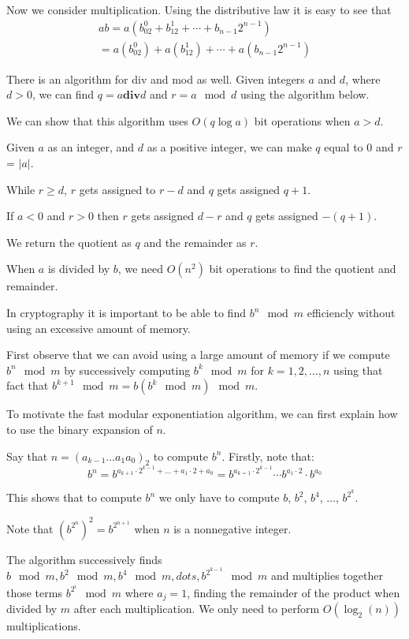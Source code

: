 \documentclass[../discrete.tex]{subfiles}
\begin{document}
Now we consider multiplication.
Using the distributive law it is easy to see that 
\begin{align*}
    ab = a(b_02^0+b_12^1+\cdots + b_{n-1}2^{n-1})\\
    = a(b_02^0)+a(b_12^1)+\cdots + a(b_{n-1}2^{n-1})
\end{align*}

There is an algorithm for div and mod as well.
Given integers $a$ and $d$, where $d>0$, we can find $q=a\textbf{div} d$ and $r=a\mod d$ using the algorithm below.

We can show that this algorithm uses $O(q\log a)$ bit operations when $a>d$.

Given $a$ as an integer, and $d$ as a positive integer, we can make $q$ equal to 0 and $r$ = $|a|$.

While $r\geq d$, $r$ gets assigned to $r-d$ and $q$ gets assigned $q+1$.

If $a<0$ and $r>0$ then $r$ gets assigned $d-r$ and $q$ gets assigned $-(q+1)$.

We return the quotient as $q$ and the remainder as $r$.

When $a$ is divided by $b$, we need $O(n^2)$ bit operations to find the quotient and remainder.

In cryptography it is important to be able to find $b^n \mod m$ efficiencly without using an excessive amount of memory.

First observe that we can avoid using a large amount of memory if we compute $b^n \mod m$ by successively computing $b^k \mod m$ for
$k = 1,2,\dots,n$ using that fact that $b^{k+1}\mod m=b(b^k\mod m)\mod m$.

To motivate the fast modular exponentiation algorithm, we can first explain how to use the binary expansion of $n$.

Say that $n=(a_{k-1}\dots a_1a_0)_2$ to compute $b^n$. Firstly, note that:
\[b^n=b^{a_{k+1}\cdot2^{k-1}+\dots+a_1\cdot2+a_0}=b^{a_{k=1}\cdot2^{k-1}}\cdots b^{a_1\cdot 2}\cdot b^{a_0}\]

This shows that to compute $b^n$ we only have to compute $b$, $b^2$, $b^4$, $\dots$, $b^{2^k}$.

Note that $(b^{2^n})^2=b^{2^{n+1}}$ when $n$ is a nonnegative integer.

The algorithm successively finds $b\mod m, b^2\mod m, b^4\mod m, dots, b^{2^{k-1}}\mod m$ and 
multiplies together those terms $b^{2^i} \mod m$ where $a_j = 1$, finding the remainder of the product when divided
by $m$ after each multiplication. We only need to perform $O(\log_2(n))$ multiplications.
\end{document}
